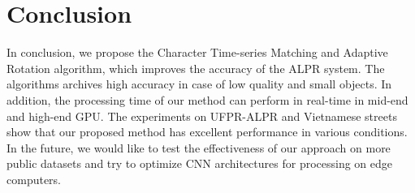 \documentclass[conference]{IEEEtran}
\begin{document}
\section{Conclusion}
In conclusion, we propose the Character Time-series Matching and Adaptive Rotation algorithm, which improves the accuracy of the ALPR system. The algorithms archives high accuracy in case of low quality and small objects. In addition, the processing time of our method can perform in real-time in mid-end and high-end GPU. The experiments on UFPR-ALPR and Vietnamese streets show that our proposed method has excellent performance in various conditions. In the future, we would like to test the effectiveness of our approach on more public datasets and try to optimize CNN architectures for processing on edge computers.

{\small


}
\end{document}
